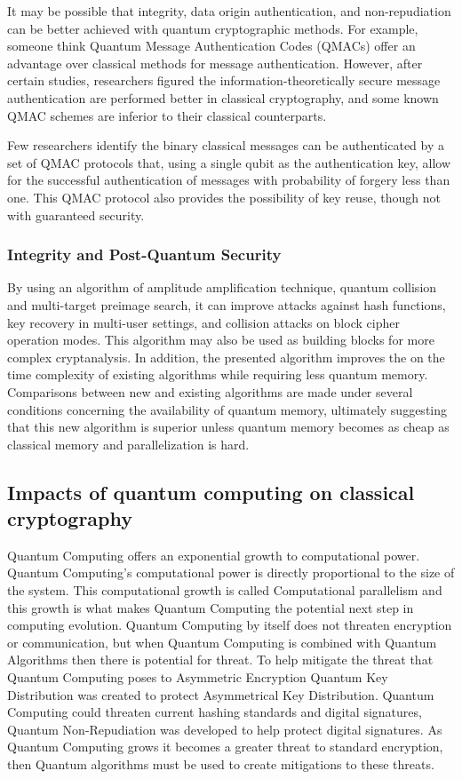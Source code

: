 \documentclass[sigconf]{acmart}
\begin{document}
It may be possible that integrity, data origin authentication, and non-repudiation can be better achieved with quantum cryptographic methods. For example, someone think Quantum Message Authentication Codes (QMACs) offer an advantage over classical methods for message authentication. However, after certain studies, researchers figured the information-theoretically secure message authentication are performed better in classical cryptography, and some known QMAC schemes are inferior to their classical counterparts\cite{nikolopoulos_information-theoretically_2020}.

Few researchers identify the binary classical messages can be authenticated by a set of QMAC protocols that, using a single qubit as the authentication key, allow for the successful authentication of messages with probability of forgery less than one. This QMAC protocol also provides the possibility of key reuse, though not with guaranteed security\cite{curty_quantum_2001}.


\subsubsection{Integrity and Post-Quantum Security} %
By using an algorithm of amplitude amplification technique, quantum collision and multi-target preimage search, it can improve attacks against hash functions, key recovery in multi-user settings, and collision attacks on block cipher operation modes. This algorithm may also be used as building blocks for more complex cryptanalysis. In addition, the presented algorithm improves the on the time complexity of existing algorithms while requiring less quantum memory. Comparisons between new and existing algorithms are made under several conditions concerning the availability of quantum memory, ultimately suggesting that this new algorithm is superior unless quantum memory becomes as cheap as classical memory and parallelization is hard\cite{chailloux_efficient_2017}.

\subsection{Impacts of quantum computing on classical cryptography}
Quantum Computing offers an exponential growth to computational power. Quantum Computing’s computational power is directly proportional to the size of the system. This computational growth is called Computational parallelism and this growth is what makes Quantum Computing the potential next step in computing evolution. Quantum Computing by itself does not threaten encryption or communication, but when Quantum Computing is combined with Quantum Algorithms then there is potential for threat. To help mitigate the threat that Quantum Computing poses to Asymmetric Encryption Quantum Key Distribution was created to protect Asymmetrical Key Distribution. Quantum Computing could threaten current hashing standards and digital signatures, Quantum Non-Repudiation was developed to help protect digital signatures. As Quantum Computing grows it becomes a greater threat to standard encryption, then Quantum algorithms must be used to create mitigations to these threats.
\end{document}
